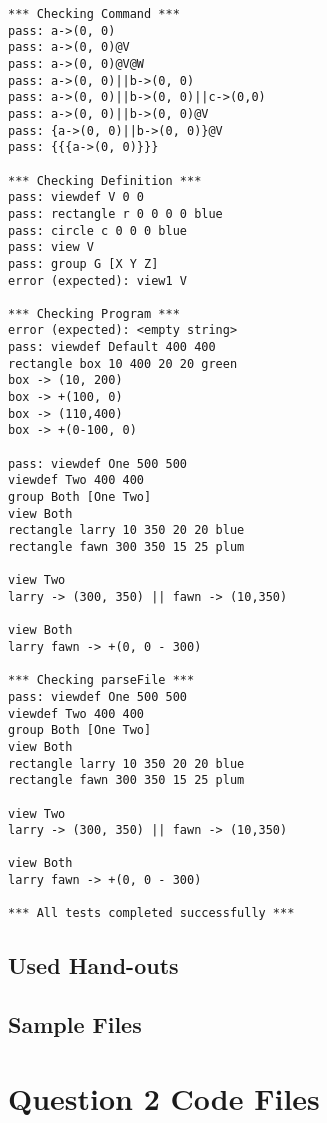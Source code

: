 \documentclass[
paper=a4,
oneside,
fontsize=11pt,
numbers=noenddot,
headinclude=false, %
footinclude=false, %
fleqn,             %
DIV=8
]{scrartcl}
\begin{document}
\begin{lstlisting}[caption=Session output: {\tt src/salsa/SalsaParserTest}, label=lst:testoutparser]
*** Checking Command ***
pass: a->(0, 0)
pass: a->(0, 0)@V
pass: a->(0, 0)@V@W
pass: a->(0, 0)||b->(0, 0)
pass: a->(0, 0)||b->(0, 0)||c->(0,0)
pass: a->(0, 0)||b->(0, 0)@V
pass: {a->(0, 0)||b->(0, 0)}@V
pass: {{{a->(0, 0)}}}

*** Checking Definition ***
pass: viewdef V 0 0
pass: rectangle r 0 0 0 0 blue
pass: circle c 0 0 0 blue
pass: view V
pass: group G [X Y Z]
error (expected): view1 V

*** Checking Program ***
error (expected): <empty string>
pass: viewdef Default 400 400
rectangle box 10 400 20 20 green
box -> (10, 200)
box -> +(100, 0)
box -> (110,400)
box -> +(0-100, 0)

pass: viewdef One 500 500
viewdef Two 400 400
group Both [One Two]
view Both
rectangle larry 10 350 20 20 blue
rectangle fawn 300 350 15 25 plum

view Two
larry -> (300, 350) || fawn -> (10,350)

view Both
larry fawn -> +(0, 0 - 300)

*** Checking parseFile ***
pass: viewdef One 500 500
viewdef Two 400 400
group Both [One Two]
view Both
rectangle larry 10 350 20 20 blue
rectangle fawn 300 350 15 25 plum

view Two
larry -> (300, 350) || fawn -> (10,350)

view Both
larry fawn -> +(0, 0 - 300)

*** All tests completed successfully ***
\end{lstlisting}


\subsection{Used Hand-outs}
\label{sec:hand-outs-used}


\subsection{Sample Files}
\label{sec:sample-files}




\clearpage
\section{Question 2 Code Files}
\label{sec:question-2-code}
\end{document}
